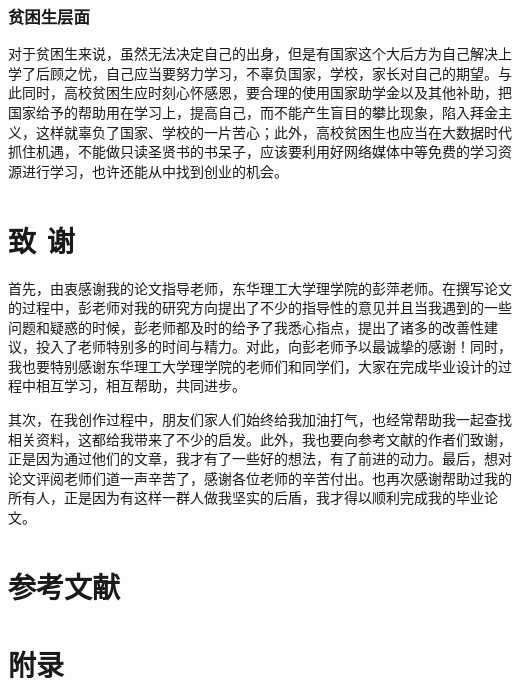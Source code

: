 \documentclass[UTF8,a4paper,12pt]{ctexart}  %
\begin{document}
\hypertarget{section-37}{%
\subsubsection{贫困生层面}\label{section-37}}

对于贫困生来说，虽然无法决定自己的出身，但是有国家这个大后方为自己解决上学了后顾之忧，自己应当要努力学习，不辜负国家，学校，家长对自己的期望。与此同时，高校贫困生应时刻心怀感恩，要合理的使用国家助学金以及其他补助，把国家给予的帮助用在学习上，提高自己，而不能产生盲目的攀比现象，陷入拜金主义，这样就辜负了国家、学校的一片苦心；此外，高校贫困生也应当在大数据时代抓住机遇，不能做只读圣贤书的书呆子，应该要利用好网络媒体中等免费的学习资源进行学习，也许还能从中找到创业的机会。

\hypertarget{section-38}{%
\section{致 谢}\label{section-38}}

首先，由衷感谢我的论文指导老师，东华理工大学理学院的彭萍老师。在撰写论文的过程中，彭老师对我的研究方向提出了不少的指导性的意见并且当我遇到的一些问题和疑惑的时候，彭老师都及时的给予了我悉心指点，提出了诸多的改善性建议，投入了老师特别多的时间与精力。对此，向彭老师予以最诚挚的感谢！同时，我也要特别感谢东华理工大学理学院的老师们和同学们，大家在完成毕业设计的过程中相互学习，相互帮助，共同进步。

其次，在我创作过程中，朋友们家人们始终给我加油打气，也经常帮助我一起查找相关资料，这都给我带来了不少的启发。此外，我也要向参考文献的作者们致谢，正是因为通过他们的文章，我才有了一些好的想法，有了前进的动力。最后，想对论文评阅老师们道一声辛苦了，感谢各位老师的辛苦付出。也再次感谢帮助过我的所有人，正是因为有这样一群人做我坚实的后盾，我才得以顺利完成我的毕业论文。

\hypertarget{section-39}{%
\section{参考文献}\label{section-39}}

\hypertarget{section-40}{%
\section{附录}\label{section-40}}
\end{document}
